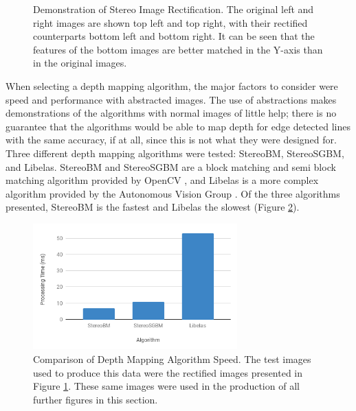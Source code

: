 \begin{figure}[H]
\begin{center}
\begin{tabular}{ c c }
    \end{tabular}
    \caption[Demonstration of Stereo Image Rectification]{Demonstration of Stereo Image Rectification. The original left and right images are shown top left and top right, with their rectified counterparts bottom left and bottom right. It can be seen that the features of the bottom images are better matched in the Y-axis than in the original images.}
    \label{fig:rect}
    \end{center}
\end{figure}

When selecting a depth mapping algorithm, the major factors to consider were speed and performance with abstracted images. The use of abstractions makes demonstrations of the algorithms with normal images of little help; there is no guarantee that the algorithms would be able to map depth for edge detected lines with the same accuracy, if at all, since this is not what they were designed for. Three different depth mapping algorithms were tested: StereoBM, StereoSGBM, and Libelas. StereoBM and StereoSGBM are a block matching and semi block matching algorithm provided by OpenCV \cite{OpenCV}, and Libelas is a more complex algorithm provided by the Autonomous Vision Group \cite{geiger2010efficient}. Of the three algorithms presented, StereoBM is the fastest and Libelas the slowest (Figure \ref{fig:speed}). 

\begin{figure}[H]
    \begin{center}
      \includegraphics[width=0.7\textwidth]{Figures/depthspeed.png}
      \caption[Comparison of Depth Mapping Algorithm Speed]{Comparison of Depth Mapping Algorithm Speed. The test images used to produce this data were the rectified images presented in Figure \ref{fig:rect}. These same images were used in the production of all further figures in this section.}
      \label{fig:speed}
    \end{center}
\end{figure}

